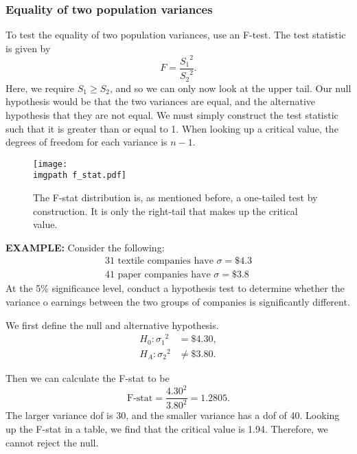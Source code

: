\documentclass[../notes_compiled.tex]{subfiles}
\begin{document}
\subsubsection{Equality of two population variances}
\begin{itemize}
\item To test the equality of two population variances, use an F-test. The test statistic is given by 
\begin{equation}
F=\frac{{S_{1}}^{2}}{{S_{2}}^{2}}.
\end{equation}
Here, we require $S_{1} \geq S_{2}$, and so we can only now look at the upper tail. Our null hypothesis would be that the two variances are equal, and the alternative hypothesis that they are not equal. We must simply construct the test statistic such that it is greater than or equal to 1. When looking up a critical value, the degrees of freedom for each variance is $n-1$.

\begin{figure}[h]
  \centering
  \texttt{[image: \\imgpath f\_stat.pdf]}
  \caption{The F-stat distribution is, as mentioned before, a one-tailed test by construction. It is only the right-tail that makes up the critical value.}
\end{figure}

{\color{RedViolet}
\item[] \textbf{EXAMPLE:} Consider the following:
\begin{gather*}
\text{31 textile companies have $\sigma=\$4.3$} \\
\text{41 paper companies have $\sigma=\$3.8$}
\end{gather*}
At the 5\% significance level, conduct a hypothesis test to determine whether the variance o earnings between the two groups of companies is significantly different.

{\color{RoyalBlue}
\item[] We first define the null and alternative hypothesis.
\begin{align*}
H_{0}: {\sigma_{1}}^{2}&=\$4.30, \\
H_{A}: {\sigma_{2}}^{2}&\neq\$3.80.
\end{align*}
}

\item[] Then we can calculate the F-stat to be
\begin{equation*}
\text{F-stat} = \frac{4.30^{2}}{3.80^{2}} = 1.2805.
\end{equation*}
The larger variance dof is 30, and the smaller variance has a dof of 40. Looking up the F-stat in a table, we find that the critical value is 1.94. Therefore, we cannot reject the null.
}
\end{itemize}
\end{document}
